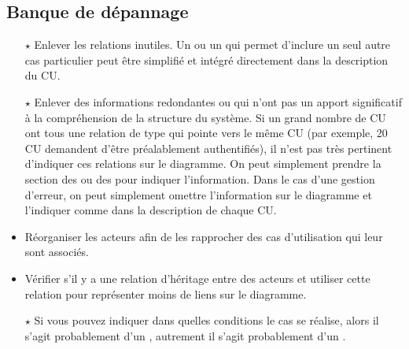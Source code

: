 \subsection{Banque de dépannage}


\begin{itemize}
	\item[$\mathbf{\star}$] Enlever les relations inutiles. Un  ou un  qui permet d'inclure un seul autre cas particulier peut être simplifié et intégré directement dans la description du \acrshort{CU}.
	\item[$\mathbf{\star}$] Enlever des informations redondantes ou qui n'ont pas un apport significatif à la compréhension de la structure du système. Si un grand nombre de \acrshort{CU} ont tous une relation de type  qui pointe vers le même \acrshort{CU} (par exemple, 20 \acrshort{CU} demandent d'être préalablement authentifiés), il n'est pas très pertinent d'indiquer ces relations sur le diagramme. On peut simplement prendre la section des   ou des   pour indiquer l'information. Dans le cas d'une gestion d'erreur, on peut simplement omettre l'information sur le diagramme et l'indiquer comme  dans la description de chaque \acrshort{CU}.
	\item Réorganiser les acteurs afin de les rapprocher des cas d'utilisation qui leur sont associés.
	\item Vérifier s'il y a une relation d'héritage entre des acteurs et utiliser cette relation pour représenter moins de liens sur le diagramme.
\end{itemize}


\begin{itemize}
	\item[$\mathbf{\star}$] Si vous pouvez indiquer dans quelles conditions le cas se réalise, alors il s'agit probablement d'un , autrement il s'agit probablement d'un .
\end{itemize}


